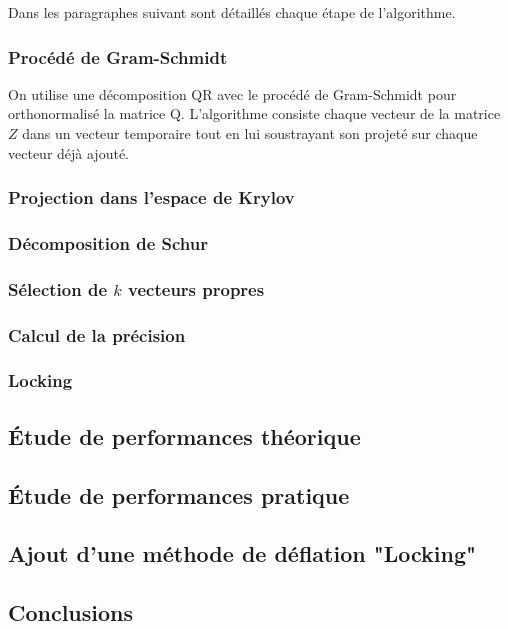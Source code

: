 \documentclass[11pt,a4paper]{article}
\begin{document}
		Dans les paragraphes suivant sont détaillés chaque étape de l'algorithme.

		\subsubsection{Procédé de Gram-Schmidt}

			On utilise une décomposition QR avec le procédé de Gram-Schmidt pour orthonormalisé la matrice Q. L'algorithme consiste chaque vecteur de la matrice $Z$ dans un vecteur temporaire tout en lui soustrayant son projeté sur chaque vecteur déjà ajouté.



		\subsubsection{Projection dans l'espace de Krylov}

		\subsubsection{Décomposition de Schur}

		\subsubsection{Sélection de $k$ vecteurs propres}

		\subsubsection{Calcul de la précision}

		\subsubsection{Locking}

	\subsection{Étude de performances théorique}
	\subsection{Étude de performances pratique}
	\subsection{Ajout d'une méthode de déflation "Locking"}
	\subsection{Conclusions}
\end{document}
